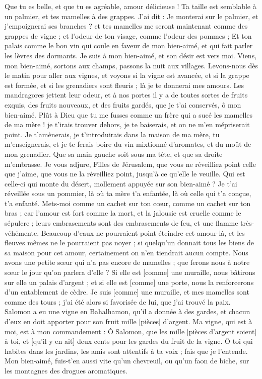 \begin{multicols}{2}
Que tu es belle, et que tu es agréable, amour délicieuse !
Ta taille est semblable à un palmier, et tes mamelles à des grappes.
J'ai dit : Je monterai sur le palmier, et j'empoignerai ses branches ? et tes mamelles me seront maintenant comme des grappes de vigne ; et l'odeur de ton visage, comme l'odeur des pommes ;
Et ton palais comme le bon vin qui coule en faveur de mon bien-aimé, et qui fait parler les lèvres des dormants.
Je suis à mon bien-aimé, et son désir est vers moi.
Viens, mon bien-aimé, sortons aux champs, passons la nuit aux villages.
Levons-nous dès le matin pour aller aux vignes, et voyons si la vigne est avancée, et si la grappe est formée, et si les grenadiers sont fleuris ; là je te donnerai mes amours.
Les mandragores jettent leur odeur, et à nos portes il y a de toutes sortes de fruits exquis, des fruits nouveaux, et des fruits gardés, que je t'ai conservés, ô mon bien-aimé.
\VerseOne{}Plût à Dieu que tu me fusses comme un frère qui a sucé les mamelles de ma mère ! je t'irais trouver dehors, je te baiserais, et on ne m'en mépriserait point.
Je t'amènerais, je t'introduirais dans la maison de ma mère, tu m'enseignerais, et je te ferais boire du vin mixtionné d'aromates, et du moût de mon grenadier.
Que sa main gauche soit sous ma tête, et que sa droite m'embrasse.
Je vous adjure, Filles de Jérusalem, que vous ne réveilliez point celle que j'aime, que vous ne la réveilliez point, jusqu'à ce qu'elle le veuille.
Qui est celle-ci qui monte du désert, mollement appuyée sur son bien-aimé ? Je t'ai réveillée sous un pommier, là où ta mère t'a enfantée, là où celle qui t'a conçue, t'a enfanté.
Mets-moi comme un cachet sur ton cœur, comme un cachet sur ton bras ; car l'amour est fort comme la mort, et la jalousie est cruelle comme le sépulcre ; leurs embrasements sont des embrasements de feu, et une flamme très-véhémente.
Beaucoup d'eaux ne pourraient point éteindre cet amour-là, et les fleuves mêmes ne le pourraient pas noyer ; si quelqu'un donnait tous les biens de sa maison pour cet amour, certainement on n'en tiendrait aucun compte.
Nous avons une petite sœur qui n'a pas encore de mamelles ; que ferons nous à notre sœur le jour qu'on parlera d'elle ?
Si elle est [comme] une muraille, nous bâtirons sur elle un palais d'argent ; et si elle est [comme] une porte, nous la renforcerons d'un entablement de cèdre.
Je suis [comme] une muraille, et mes mamelles sont comme des tours ; j'ai été alors si favorisée de lui, que j'ai trouvé la paix.
Salomon a eu une vigne en Bahalhamon, qu'il a donnée à des gardes, et chacun d'eux en doit apporter pour son fruit mille [pièces] d'argent.
Ma vigne, qui est à moi, est à mon commandement : Ô Salomon, que les mille [pièces d'argent soient] à toi, et [qu'il y en ait] deux cents pour les gardes du fruit de la vigne.
Ô toi qui habites dans les jardins, les amis sont attentifs à ta voix ; fais que je l'entende.
Mon bien-aimé, fuis-t'en aussi vite qu'un chevreuil, ou qu'un faon de biche, sur les montagnes des drogues aromatiques.
\PPE{}
\end{multicols}
